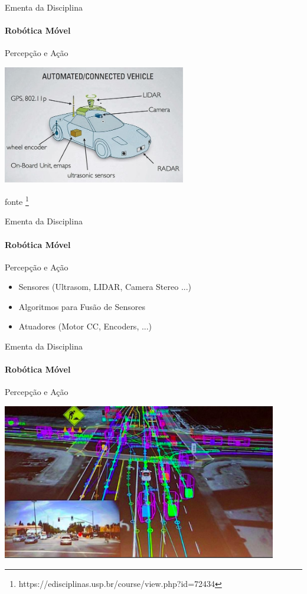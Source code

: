 \documentclass{beamer}
\newcommand{\pausar}{ }
\begin{document}
\begin{frame}[t]{Ementa da Disciplina}
	\framesubtitle{Robótica Móvel}
	\begin{block}{Percepção e Ação}
	\end{block}
	\begin{center}
		\includegraphics[width=0.6\textwidth]{./images/autonomous-car.png}

		fonte \footnote{https://edisciplinas.usp.br/course/view.php?id=72434}
	\end{center}
\end{frame}

\begin{frame}[t]{Ementa da Disciplina}
	\framesubtitle{Robótica Móvel}
	\begin{block}{Percepção e Ação}
	\end{block}
	\begin{itemize}
		\item Sensores (Ultrasom, LIDAR, Camera Stereo ...) \pausar
		\item Algoritmos para Fusão de Sensores \pausar
		\item Atuadores (Motor CC, Encoders, ...)
	\end{itemize}
\end{frame}


\begin{frame}[t]{Ementa da Disciplina}
	\framesubtitle{Robótica Móvel}
	\begin{block}{Percepção e Ação}
	\end{block}
	\begin{center}
		\includegraphics[width=0.9\textwidth]{./images/autonomous-car_2.png}
	\end{center}
\end{frame}
\end{document}
